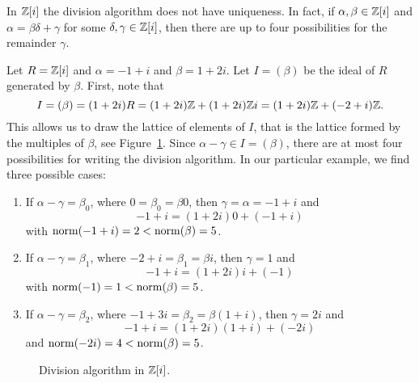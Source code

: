 In $\mathbb{Z}[i]$ the division algorithm does not have uniqueness. In fact, 
if $\alpha,\beta\in\mathbb{Z}[i]$ and $\alpha=\beta\delta+\gamma$ 
for some $\delta,\gamma\in\mathbb{Z}[i]$, 
then there are up to four possibilities 
for the remainder $\gamma$.

\begin{example}
	Let $R=\mathbb{Z}[i]$ and 
	$\alpha=-1+i$ and $\beta=1+2i$. Let $I=(\beta)$ be the ideal of $R$ generated by $\beta$. 
	First, note that
	\[
	I=(\beta)=(1+2i)R=(1+2i)\mathbb{Z}+(1+2i)\mathbb{Z} i=(1+2i)\mathbb{Z}+(-2+i)\mathbb{Z}.
	\]  
	This allows us to draw the lattice of elements of $I$, 
	that is the lattice formed by the multiples of $\beta$, see Figure~\ref{fig:Z[i]}. 
	Since $\alpha-\gamma\in I=(\beta)$, there are at most four possibilities for writing
	the division algorithm. 
	In our particular example, we find three possible cases:
	\begin{enumerate}
		\item If $\alpha-\gamma=\beta_0$, where $0=\beta_0=\beta 0$, 
			then $\gamma=\alpha=-1+i$ and 
				\[
				-1+i=(1+2i)0+(-1+i)
				\]
				with $\operatorname{norm}(-1+i)=2<\operatorname{norm}(\beta)=5$. 
		\item If $\alpha-\gamma=\beta_1$, where $-2+i=\beta_1=\beta i$, then 
			$\gamma=1$ and 
			\[
			-1+i=(1+2i)i+(-1)
			\]
			with $\operatorname{norm}(-1)=1<\operatorname{norm}(\beta)=5$. 
		\item If $\alpha-\gamma=\beta_2$, where $-1+3i=\beta_2=\beta (1+i)$, 
			then $\gamma=2i$ and  
			\[
			-1+i=(1+2i)(1+i)+(-2i)
			\]
			and $\operatorname{norm}(-2i)=4<\operatorname{norm}(\beta)=5$. 
	\end{enumerate}
\end{example}

\begin{figure}
\caption{Division algorithm in $\mathbb{Z}[i]$.}
\label{fig:Z[i]}
\end{figure}

